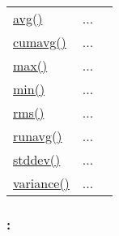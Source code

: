 \textcolor{blue}{}\begin{tabular}{>{\raggedleft}p{3cm}>{\centering}p{0.5cm}l}
\textcolor{blue}{\hyperlink{avg}{avg()}}&
...&
 \begin{NoHyper} \nameref{par:Average} \end{NoHyper}\tabularnewline
\textcolor{blue}{\hyperlink{cumavg}{cumavg()}}&
...&
 \begin{NoHyper} \nameref{par:Cumulative-average} \end{NoHyper}\tabularnewline
\textcolor{blue}{\hyperlink{max}{max()}}&
...&
 \begin{NoHyper} \nameref{par:Maximum} \end{NoHyper}\tabularnewline
\textcolor{blue}{\hyperlink{min}{min()}}&
...&
 \begin{NoHyper} \nameref{par:Minimum} \end{NoHyper}\tabularnewline
\textcolor{blue}{\hyperlink{rms}{rms()}}&
...&
 \begin{NoHyper} \nameref{par:rms} \end{NoHyper}\tabularnewline
\textcolor{blue}{\hyperlink{runavg}{runavg()}}&
...&
 \begin{NoHyper} \nameref{par:Running-average} \end{NoHyper}\tabularnewline
\textcolor{blue}{\hyperlink{stddev}{stddev()}}&
...&
 \begin{NoHyper} \nameref{par:Standard-deviation} \end{NoHyper}\tabularnewline
\textcolor{blue}{\hyperlink{variance}{variance()}}&
...&
 \begin{NoHyper} \nameref{par:Variance} \end{NoHyper}\tabularnewline
\end{tabular}


\subsubsection*{: }

